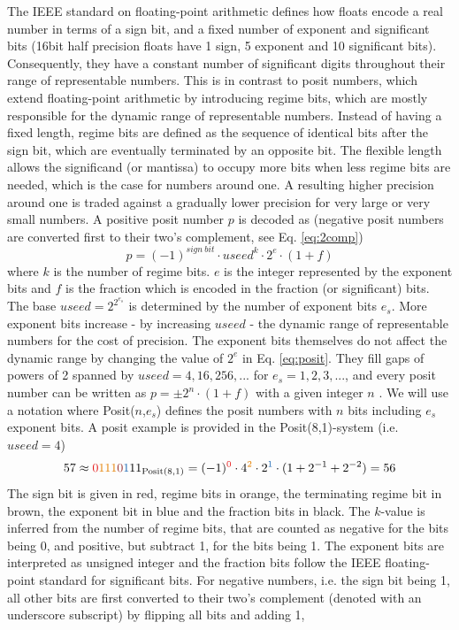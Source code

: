 \documentclass[draft]{agujournal2019}
\newcommand{\op}{\operatorname}
\begin{document}
The IEEE standard on floating-point arithmetic \cite{IEEE} defines how floats encode a real number in terms of a sign bit, and a fixed number of exponent and significant bits (16bit half precision floats have 1 sign, 5 exponent and 10 significant bits). Consequently, they have a constant number of significant digits throughout their range of representable numbers. This is in contrast to posit numbers, which extend floating-point arithmetic by introducing regime bits, which are mostly responsible for the dynamic range of representable numbers. Instead of having a fixed length, regime bits are defined as the sequence of identical bits after the sign bit, which are eventually terminated by an opposite bit. The flexible length allows the significand (or mantissa) to occupy more bits when less regime bits are needed, which is the case for numbers around one. A resulting higher precision around one is traded against a gradually lower precision for very large or very small numbers. A positive posit number $p$ is decoded as \cite{Gustafson2017,Gustafson2017b} (negative posit numbers are converted first to their two's complement, see Eq. \ref{eq:2comp})
\begin{equation}
p = (-1)^{sign~bit} \cdot useed^k \cdot 2^e \cdot (1+f)
\label{eq:posit}
\end{equation}
where $k$ is the number of regime bits. $e$ is the integer represented by the exponent bits and $f$ is the fraction which is encoded in the fraction (or significant) bits. The base $useed = 2^{2^{e_s}}$ is determined by the number of exponent bits $e_s$. More exponent bits increase - by increasing $useed$ - the dynamic range of representable numbers for the cost of precision. The exponent bits themselves do not affect the dynamic range by changing the value of $2^e$ in Eq. \ref{eq:posit}. They fill gaps of powers of 2 spanned by $useed = 4,16,256,...$ for $e_s=1,2,3,...$, and every posit number can be written as $p = \pm 2^n \cdot (1+f)$ with a given integer $n$ \cite{Gustafson2017,Chen2018}. We will use a notation where Posit($n$,$e_s$) defines the posit numbers with $n$ bits including $e_s$ exponent bits. A posit example is provided in the Posit(8,1)-system (i.e. $useed = 4$)
\begin{equation}
57 \approx {\color{psign}0}{\color{pregime}111}{\color{pregimet}0}{\color{pexpo}1}11_{\op{Posit}(8,1)} = (-1)^{\color{psign}0} \cdot 4^{\color{pregime}2} \cdot 2^{\color{pexpo}1} \cdot (1+2^{-1}+2^{-2}) = 56
\label{eq:posit_pos}
\end{equation}
The sign bit is given in red, regime bits in orange, the terminating regime bit in brown, the exponent bit in blue and the fraction bits in black. The $k$-value is inferred from the number of regime bits, that are counted as negative for the bits being 0, and positive, but subtract 1, for the bits being 1. The exponent bits are interpreted as unsigned integer and the fraction bits follow the IEEE floating-point standard for significant bits. For negative numbers, i.e. the sign bit being 1, all other bits are first converted to their two's complement (denoted with an underscore subscript) by flipping all bits and adding 1,
\end{document}
